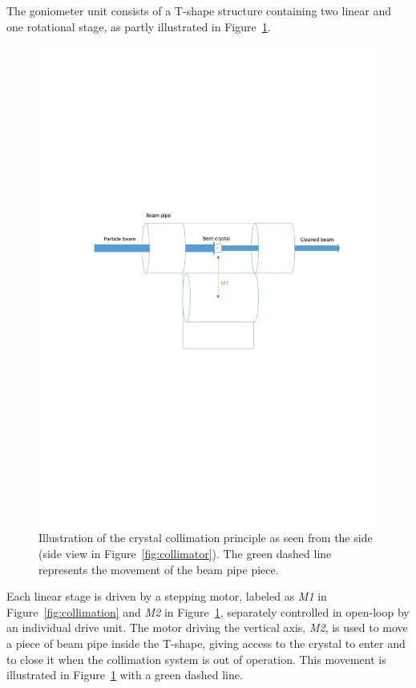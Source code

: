 The goniometer unit consists of a T-shape structure containing two linear and one rotational stage, as partly illustrated in Figure~\ref{fig:goniometer}.

\begin{figure}[h]
  \centering %
  \includegraphics[width=1\textwidth, trim= 2cm 12cm 1cm 10cm, clip=true]{fig/matlab/goniometer}
  \caption{\label{fig:goniometer}Illustration of the crystal collimation principle as seen from the side (side view in Figure~\ref{fig:collimator}). The green dashed line represents the movement of the beam pipe piece.}
\end{figure}

Each linear stage is driven by a stepping motor, labeled as \emph{M1} in Figure~\ref{fig:collimation} and \emph{M2} in Figure~\ref{fig:goniometer}, separately controlled in open-loop by an individual drive unit. The motor driving the vertical axis, \emph{M2}, is used to move a piece of beam pipe inside the T-shape, giving access to the crystal to enter and to close it when the collimation system is out of operation. This movement is illustrated in Figure~\ref{fig:goniometer} with a green dashed line.

